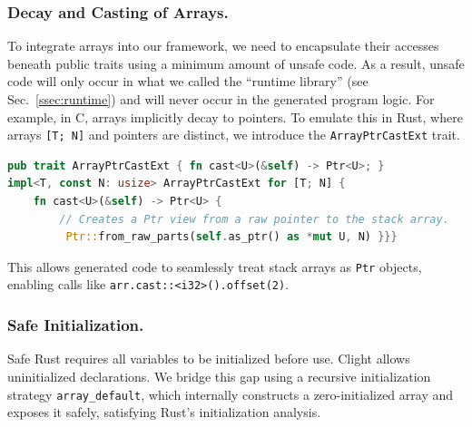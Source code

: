 \documentclass{llncs} %
\begin{document}

\subsubsection{Decay and Casting of Arrays.}
%
To integrate arrays into our framework, we need to encapsulate their accesses beneath public traits using a minimum amount of unsafe code. As a result, unsafe code will only occur in what we called the ``runtime library'' (see Sec.~\ref{ssec:runtime}) and will never occur in the generated program logic.
%
For example, in C, arrays implicitly decay to pointers. To emulate this in Rust, where arrays \texttt{[T; N]} and pointers are distinct, we introduce the \texttt{ArrayPtrCastExt} trait.
\begin{lstlisting}[language=Rust]
pub trait ArrayPtrCastExt { fn cast<U>(&self) -> Ptr<U>; }
impl<T, const N: usize> ArrayPtrCastExt for [T; N] {
    fn cast<U>(&self) -> Ptr<U> {
        // Creates a Ptr view from a raw pointer to the stack array.
         Ptr::from_raw_parts(self.as_ptr() as *mut U, N) }}}
\end{lstlisting}
This allows generated code to seamlessly treat stack arrays as \texttt{Ptr} objects, enabling calls like \texttt{arr.cast::<i32>().offset(2)}.

\subsubsection{Safe Initialization.}
Safe Rust requires all variables to be initialized before use. Clight allows uninitialized declarations. We bridge this gap using a recursive initialization strategy \texttt{array\_default}, which internally constructs a zero-initialized array and exposes it safely, satisfying Rust's initialization analysis.
\end{document}
